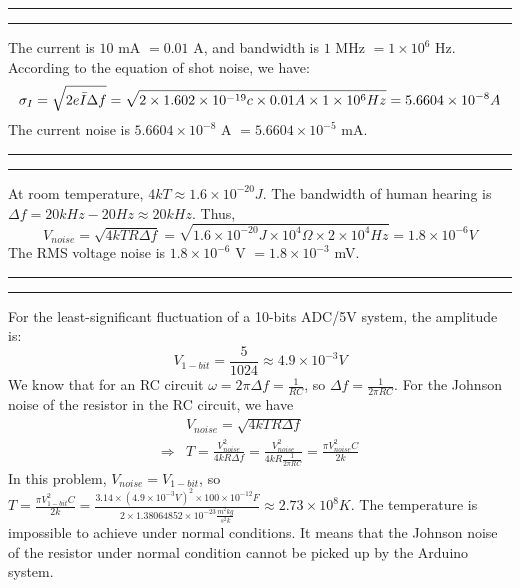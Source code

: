 \documentclass[11pt]{article}
\newcounter{questionCounter}
\newcounter{partCounter}[questionCounter]
\newenvironment{question}[2][\arabic{questionCounter}]{%
    \addtocounter{questionCounter}{1}%
    \setcounter{partCounter}{0}%
    \vspace{.25in} \hrule \vspace{0.5em}%
        \noindent{\bf #2}%
    \vspace{0.8em} \hrule \vspace{.10in}%
}{}
\begin{document}
\begin{question}{Problem 5}
The current is $10$ mA $= 0.01$ A, and bandwidth is $1$ MHz $= 1 \times 10^{6}$ Hz. According to the equation of shot noise, we have:
\begin{equation*}
    \sigma_{I} = \sqrt{2e\Bar{I}\Delta f} = \sqrt{2 \times 1.602 \times 10^{-19} c \times 0.01 A \times 1 \times 10^{6} Hz} = 5.6604 \times 10^{-8} A
\end{equation*}
The current noise is $5.6604 \times 10^{-8}$ A $= 5.6604 \times 10^{-5}$ mA.
\end{question}

\begin{question}{Problem 6}
    At room temperature, $4kT \approx 1.6 \times 10^{-20} J$. The bandwidth of human hearing is  $\Delta f = 20 kHz - 20 Hz \approx 20 kHz$. Thus,
 \begin{equation*}
    V_{noise} = \sqrt{4kTR\Delta f} = \sqrt{1.6 \times 10^{-20} J \times 10^4 \Omega \times 2 \times 10^4 Hz} = 1.8 \times 10^{-6} V
    \end{equation*}   
The RMS voltage noise is $1.8 \times 10^{-6}$ V $= 1.8 \times 10^{-3}$ mV.
\end{question}

\begin{question}{Problem 7}
For the least-significant fluctuation of a 10-bits ADC/5V system, the amplitude is:
\begin{equation*}
    V_{1-bit} = \frac{5}{1024} \approx 4.9 \times 10^{-3} V
\end{equation*}
We know that for an RC circuit $\omega = 2\pi\Delta f = \frac{1}{RC}$, so $\Delta f = \frac{1}{2\pi RC}$. For the Johnson noise of the resistor in the RC circuit, we have
\begin{align*}
    &V_{noise} = \sqrt{4kTR\Delta f} \\
    \Longrightarrow& T = \frac{V_{noise}^2}{4kR\Delta f} = \frac{V_{noise}^2}{4kR \frac{1}{2\pi RC}} = \frac{\pi V_{noise}^2 C}{2k}
\end{align*}
In this problem, $V_{noise} = V_{1-bit}$, so $T = \frac{\pi V_{1-bit}^2 C}{2k} =\frac{3.14 \times (4.9 \times 10^{-3} V)^2 \times 100 \times 10^{-12} F}{2 \times 1.38064852 \times 10^{-23} \frac{m^2 kg}{s^2 k}} \approx 2.73 \times 10^{8} K$. The temperature is impossible to achieve under normal conditions. It means that the Johnson noise of the resistor under normal condition cannot be picked up by the Arduino system.
\end{question}
\end{document}
